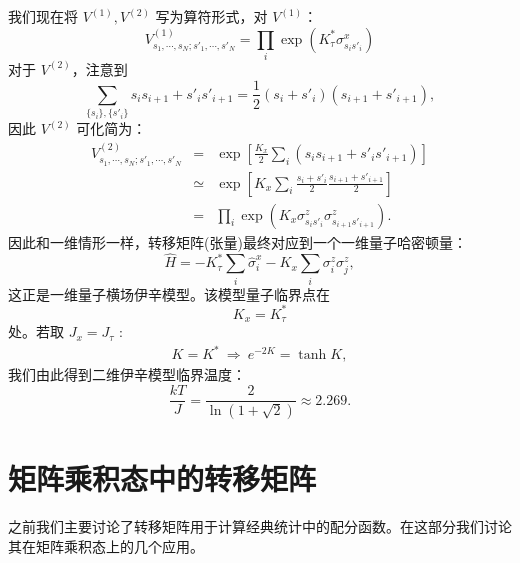 \documentclass[UTF8]{ctexart}
\begin{document}
我们现在将 $V^{(1)},V^{(2)}$ 写为算符形式，对 $V^{(1)}$：
\begin{equation}
	V^{(1)}_{s_1,\cdots,s_N;s'_1,\cdots,s'_N} = \prod_i \exp(K^*_\tau \sigma^x_{s_is'_i})
\end{equation} 
对于 $V^{(2)}$，注意到
\begin{equation}
	\sum_{\{s_i\},\{s'_i\}}s_is_{i+1}+s'_i s'_{i+1} =  \frac{1}{2}(s_i+s'_i)(s_{i+1}+s'_{i+1}),
\end{equation}
因此 $V^{(2)}$ 可化简为：
\begin{eqnarray}
	V^{(2)}_{s_1,\cdots,s_N;s'_1,\cdots,s'_N} &=&  \exp\left[\frac{K_{x}}{2}\sum_{i}(s_is_{i+1}+s'_i s'_{i+1})\right] \\
	&\simeq& \exp\left[K_{x}\sum_{i}\frac{s_i+s'_i}{2}\frac{s_{i+1}+s'_{i+1}}{2}\right] \\
	&=& \prod_{i}\exp\left(K_x \sigma^z_{s_is'_i}\sigma^z_{s_{i+1}s'_{i+1}}\right).
\end{eqnarray}
因此和一维情形一样，转移矩阵(张量)最终对应到一个一维量子哈密顿量：
\begin{equation}
	\hat{H}=-K^*_\tau \sum_{i}\hat\sigma_{i}^{x}-K_x\sum_{i}\sigma_{i}^{z}\sigma_{j}^{z},
\end{equation}
这正是一维量子横场伊辛模型。该模型量子临界点在
\begin{equation}
	K_{x} = K_{\tau}^{*}
\end{equation}
处。若取  $ J_{x}=J_{\tau} $ :
\begin{eqnarray}
	K = K^{*}\ \Longrightarrow \ e^{-2K} = \tanh K,
\end{eqnarray}
我们由此得到二维伊辛模型临界温度：
\begin{equation}
	\frac{kT}{J}=\frac{2}{\ln\left(1+\sqrt{2}\right)}\approx2.269.
\end{equation}
 


\section*{矩阵乘积态中的转移矩阵}
\noindent
之前我们主要讨论了转移矩阵用于计算经典统计中的配分函数。在这部分我们讨论其在矩阵乘积态上的几个应用。
\end{document}
